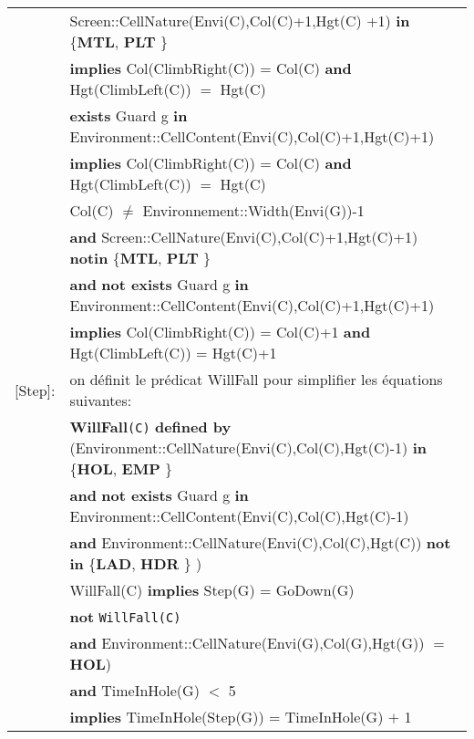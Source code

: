 \documentclass[8pt]{article}
\begin{document}
{\begin{longtable}{rl}
  & \textrm{Screen::CellNature(Envi(C),Col(C)+1,Hgt(C) +1)} \textbf{in} \{\textbf{MTL}, \textbf{PLT} \} \\ & \quad\quad \textbf{implies} \textrm{Col(ClimbRight(C))} = \textrm{Col(C)} \textbf{and} \textrm{Hgt(ClimbLeft(C))} $=$ \textrm{Hgt(C)} \\
  & \textbf{exists} \textrm{Guard} g \textbf{in} \textrm{Environment::CellContent(Envi(C),Col(C)+1,Hgt(C)+1)} \\
  & \quad\quad \textbf{implies} \textrm{Col(ClimbRight(C))} = \textrm{Col(C)} \textbf{and} \textrm{Hgt(ClimbLeft(C))} $=$ \textrm{Hgt(C)} \\
  & \textrm{Col(C)} $\neq$ Environnement::Width(Envi(G))-1 \\
  & \quad\quad \textbf{and} \textrm{Screen::CellNature(Envi(C),Col(C)+1,Hgt(C)+1)} \textbf{notin} \{\textbf{MTL}, \textbf{PLT} \} \\
  & \quad\quad \textbf{and} \textbf{not exists} \textrm{Guard} g \textbf{in} \textrm{Environment::CellContent(Envi(C),Col(C)+1,Hgt(C)+1)} \\
  & \quad\quad \textbf{implies} \textrm{Col(ClimbRight(C))} = \textrm{Col(C)}+1 \textbf{and} \textrm{Hgt(ClimbLeft(C))} = \textrm{Hgt(C)}+1 \\
  \textrm{[Step]}:
  & on définit le prédicat WillFall pour simplifier les équations suivantes: \\
  & \textbf{WillFall}\texttt{(C)} \textbf{defined by} (\textrm{Environment::CellNature(Envi(C),Col(C),Hgt(C)-1)} \textbf{in} \{\textbf{HOL}, \textbf{EMP} \}  \\
  & \quad\quad\quad\quad\quad\quad\quad\quad\quad\quad \textbf{and} \textbf{not exists} \textrm{Guard} g \textbf{in} \textrm{Environment::CellContent(Envi(C),Col(C),Hgt(C)-1)} \\
  & \quad\quad\quad\quad\quad\quad\quad\quad\quad\quad \textbf{and} \textrm{Environment::CellNature(Envi(C),Col(C),Hgt(C))} \textbf{not in} \{\textbf{LAD}, \textbf{HDR} \} ) \\
  & \textrm{WillFall(C)} \textbf{implies} \textrm{Step(G)} = \textrm{GoDown(G)} \\
  & \textbf{not} \texttt{WillFall(C)} \\
  & \quad\quad \textbf{and} \textrm{Environment::CellNature(Envi(G),Col(G),Hgt(G))} $=$ \textbf{HOL}) \\
  & \quad\quad \textbf{and} \textrm{TimeInHole(G)} $<$ 5 \\
  & \quad\quad \textbf{implies} \textrm{TimeInHole(Step(G))} = \textrm{TimeInHole(G)} $+$ 1 \\

\end{longtable}}
\end{document}
